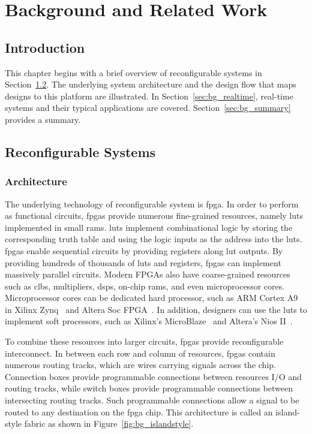 
\chapter{Background and Related Work}

\label{ch:background}

\section{Introduction}

This chapter begins with a brief overview of reconfigurable systems in Section~\ref{sec:bg_reconfig}.
The underlying system architecture and the design flow that maps designs to this platform are illustrated.
In Section~\ref{sec:bg_realtime}, real-time systems and their typical applications are covered.
Section~\ref{sec:bg_summary} provides a summary.

\section{Reconfigurable Systems}
\label{sec:bg_reconfig}

\subsection{Architecture}

The underlying technology of reconfigurable system is \gls{fpga}.
In order to perform as functional circuits, \glspl{fpga} provide numerous fine-grained resources, namely \glspl{lut} implemented in small \glspl{ram}.
\glspl{lut} implement combinational logic by storing the corresponding truth table and using the logic inputs as the address into the \glspl{lut}.
\glspl{fpga} enable sequential circuits by providing registers along \gls{lut} outputs.
By providing hundreds of thousands of \glspl{lut} and registers, \glspl{fpga} can implement massively parallel circuits.
Modern FPGAs also have coarse-grained resources such as \glspl{clb}, multipliers, \glspl{dsp}, on-chip \glspl{ram}, and even microprocessor cores.
Microprocessor cores can be dedicated hard processor, such as ARM Cortex A9 in Xilinx Zynq~\cite{xilinxzynq} and Altera Soc FPGA~\cite{alterasoc}.
In addition, designers can use the \glspl{lut} to implement soft processors, such as Xilinx's MicroBlaze~\cite{xilinxmicroblaze} and Altera's Nios II~\cite{alteranios2}.

To combine these resources into larger circuits, \glspl{fpga} provide reconfigurable interconnect.
In between each row and column of resources, \glspl{fpga} contain numerous routing tracks, which are wires carrying signals across the chip.
Connection boxes provide programmable connections between resources I/O and routing tracks, while switch boxes provide programmable connections between intersecting routing tracks.
Such programmable connections allow a signal to be routed to any destination on the \gls{fpga} chip.
This architecture is called an island-style fabric as shown in Figure~\ref{fig:bg_islandstyle}.

